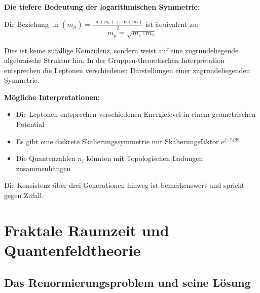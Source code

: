 \documentclass[12pt,a4paper]{article}
\newcommand{\xipar}{\xi}
\begin{document}
	\begin{abhandlung}
		\textbf{Die tiefere Bedeutung der logarithmischen Symmetrie:}
		
		Die Beziehung $\ln(m_\mu) = \frac{\ln(m_e) + \ln(m_\tau)}{2}$ ist äquivalent zu:
		\begin{equation}
			m_\mu = \sqrt{m_e \cdot m_\tau}
		\end{equation}
		
		Dies ist keine zufällige Koinzidenz, sondern weist auf eine zugrundeliegende algebraische Struktur hin. In der Gruppen-theoretischen Interpretation entsprechen die Leptonen verschiedenen Darstellungen einer zugrundeliegenden Symmetrie.
		
		\textbf{Mögliche Interpretationen:}
		\begin{itemize}
			\item Die Leptonen entsprechen verschiedenen Energielevel in einem geometrischen Potential
			\item Es gibt eine diskrete Skalierungssymmetrie mit Skalierungsfaktor $e^{\xipar \cdot 7499}$
			\item Die Quantenzahlen $n_i$ könnten mit Topologischen Ladungen zusammenhängen
		\end{itemize}
		
		Die Konsistenz über drei Generationen hinweg ist bemerkenswert und spricht gegen Zufall.
	\end{abhandlung}
	
	\section{Fraktale Raumzeit und Quantenfeldtheorie}
	
	\subsection{Das Renormierungsproblem und seine Lösung}
	
\end{document}
